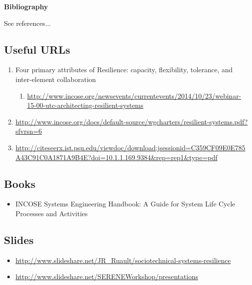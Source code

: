 \documentclass[11pt]{article}
\begin{document}

\begin{center}
  {\Large \bf Bibliography}
\end{center}
See references...
\nocite{*}

\subsection{Useful URLs}
\begin{enumerate}
	\item Four primary attributes of Resilience: capacity, flexibility, tolerance, and inter-element collaboration
	\begin{enumerate}
		\item \url{http://www.incose.org/newsevents/currentevents/2014/10/23/webinar-15-00-utc-architecting-resilient-systems}
	\end{enumerate}
	\item \url{http://www.incose.org/docs/default-source/wgcharters/resilient-systems.pdf?sfvrsn=6}
	\item \url{http://citeseerx.ist.psu.edu/viewdoc/download;jsessionid=C359CF09E0E785A43C91C0A1871A9B4E?doi=10.1.1.169.9384&rep=rep1&type=pdf}
\end{enumerate}

\subsection{Books}
\begin{itemize}
\item INCOSE Systems Engineering Handbook: A Guide for System Life Cycle Processes and Activities
\end{itemize}

\subsection{Slides}
\begin{itemize}
	\item \url{http://www.slideshare.net/JR_Ruault/sociotechnical-systems-resilience}
	\item \url{http://www.slideshare.net/SERENEWorkshop/presentations}
\end{itemize}    


 
\end{document}
